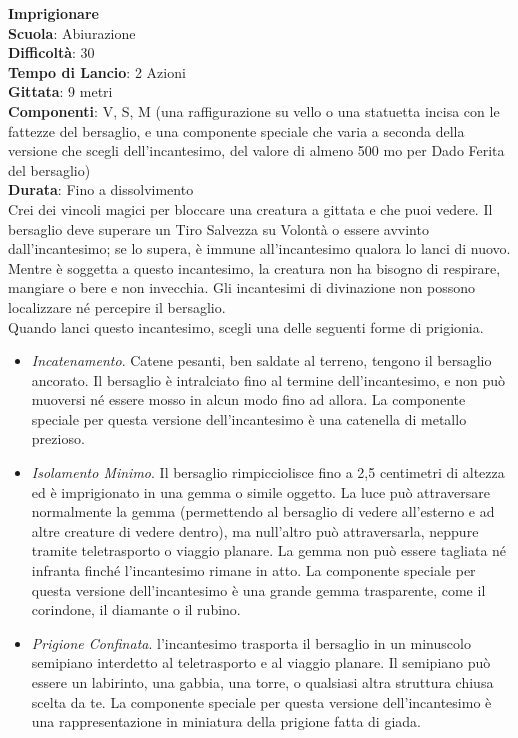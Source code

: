 \begin{multicols}{2}
\medskip\textbf{Imprigionare}\\
\textbf{Scuola}: Abiurazione\\
\textbf{Difficoltà}:  30\\
\textbf{Tempo di Lancio}: 2 Azioni\\
\textbf{Gittata}: 9 metri\\
\textbf{Componenti}: V, S, M (una raffigurazione su vello o una statuetta incisa con le fattezze del bersaglio, e una componente speciale che varia a seconda della versione che scegli dell'incantesimo, del valore di almeno 500 mo per Dado Ferita del bersaglio)\\
\textbf{Durata}: Fino a dissolvimento\\
Crei dei vincoli magici per bloccare una creatura a gittata e che puoi vedere. Il bersaglio deve superare un Tiro Salvezza su Volontà o essere avvinto dall'incantesimo; se lo supera, è immune all'incantesimo qualora lo lanci di nuovo. Mentre è soggetta a questo incantesimo, la creatura non ha bisogno di respirare, mangiare o bere e non invecchia. Gli incantesimi di divinazione non possono localizzare né percepire il bersaglio.\\
Quando lanci questo incantesimo, scegli una delle seguenti forme di prigionia.
\medskip
\begin{itemize}
\item
\textit{Incatenamento}. Catene pesanti, ben saldate al terreno, tengono il bersaglio ancorato. Il bersaglio è intralciato fino al termine dell'incantesimo, e non può muoversi né essere mosso in alcun modo fino ad allora. La componente speciale per questa versione dell'incantesimo è una catenella di metallo prezioso. 
\item
\textit{Isolamento Minimo}. Il bersaglio rimpicciolisce fino a 2,5 centimetri di altezza ed è imprigionato in una gemma o simile oggetto. La luce può attraversare normalmente la gemma (permettendo al bersaglio di vedere all'esterno e ad altre creature di vedere dentro), ma null'altro può attraversarla, neppure tramite teletrasporto o viaggio planare. La gemma non può essere tagliata né infranta finché l'incantesimo rimane in atto. La componente speciale per questa versione dell'incantesimo è una grande gemma trasparente, come il corindone, il diamante o il rubino.
\item
\textit{Prigione Confinata}. l'incantesimo trasporta il bersaglio in un minuscolo semipiano interdetto al teletrasporto e al viaggio planare. Il semipiano può essere un labirinto, una gabbia, una torre, o qualsiasi altra struttura chiusa scelta da te. La componente speciale per questa versione dell'incantesimo è una rappresentazione in miniatura della prigione fatta di giada.

\end{itemize}
\end{multicols}
